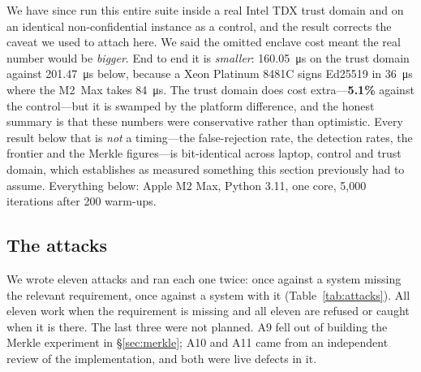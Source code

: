 \documentclass[11pt]{article}
\begin{document}
We have since run this entire suite inside a real Intel TDX trust domain and on
an identical non-confidential instance as a control, and the result corrects the
caveat we used to attach here. We said the omitted enclave cost meant the real
number would be \emph{bigger}. End to end it is \emph{smaller}:
\SI{160.05}{\micro\second} on the trust domain against
\SI{201.47}{\micro\second} below, because a Xeon Platinum 8481C signs Ed25519
in \SI{36}{\micro\second} where the M2~Max takes \SI{84}{\micro\second}.
The trust domain does cost extra---\textbf{5.1\%} against the control---but it
is swamped by the platform difference, and the honest summary is that these
numbers were conservative rather than optimistic. Every result below that is
\emph{not} a timing---the false-rejection rate, the detection rates, the
frontier and the Merkle figures---is bit-identical across laptop, control and
trust domain, which establishes as measured something this section previously
had to assume. Everything below: Apple M2 Max, Python 3.11, one core, 5{,}000
iterations after 200 warm-ups.

\subsection{The attacks}
We wrote eleven attacks and ran each one twice: once against a system missing
the relevant requirement, once against a system with it
(Table~\ref{tab:attacks}). All eleven work when the requirement is missing and
all eleven are refused or caught when it is there. The last three were not
planned. A9 fell out of building the Merkle experiment in \S\ref{sec:merkle};
A10 and A11 came from an independent review of the implementation, and both
were live defects in it.
\end{document}
